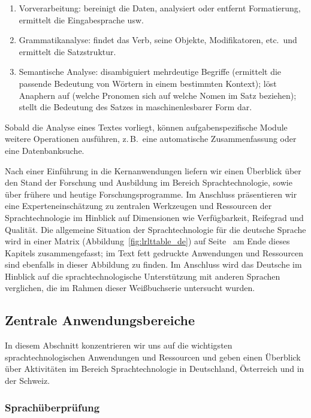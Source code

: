 \documentclass[]{../../metanetpaper}
\begin{document}
\begin{multicols}{2}
\begin{enumerate}
\item Vorverarbeitung: bereinigt die Daten, analysiert oder entfernt Formatierung, ermittelt die Eingabesprache usw.
\item Grammatikanalyse: findet das Verb, seine Objekte, Modifikatoren, etc.~und ermittelt die Satzstruktur.
\item Semantische Analyse: disambiguiert mehrdeutige Begriffe (ermittelt die passende Bedeutung von Wörtern in einem bestimmten Kontext); löst Anaphern auf (welche Pronomen sich auf welche Nomen im Satz beziehen); stellt die Bedeutung des Satzes in maschinenlesbarer Form dar.
\end{enumerate}

Sobald die Analyse eines Textes vorliegt, können aufgabenspezifische Module weitere Operationen ausführen, z.\,B.~eine automatische Zusammenfassung oder eine Datenbanksuche. 

Nach einer Einführung in die Kernanwendungen liefern wir einen Überblick über den Stand der Forschung und Ausbildung im Bereich Sprachtechnologie, sowie über frühere und heutige Forschungsprogramme. Im Anschluss präsentieren wir eine Experteneinschätzung zu zentralen Werkzeugen und Ressourcen der Sprachtechnologie im Hinblick auf Dimensionen wie Verfügbarkeit, Reifegrad und Qualität. Die allgemeine Situation der Sprachtechnologie für die deutsche Sprache wird in einer Matrix (Abbildung~\ref{fig:lrlttable_de}) auf Seite~\pageref{fig:lrlttable_de} am Ende dieses Kapitels zusammengefasst; im Text fett gedruckte Anwendungen und Ressourcen sind ebenfalls in dieser Abbildung zu finden. Im Anschluss wird das Deutsche im Hinblick auf die sprachtechnologische Unterstützung mit anderen Sprachen verglichen, die im Rahmen dieser Weißbuchserie untersucht wurden.

\subsection{Zentrale Anwendungsbereiche} 

In diesem Abschnitt konzentrieren wir uns auf die wichtigsten sprachtechnologischen Anwendungen und Ressourcen und geben einen Überblick über Aktivitäten im Bereich Sprachtechnologie in Deutschland, Österreich und in der Schweiz. 

\subsubsection{Sprachüberprüfung}


\end{multicols}
\end{document}
